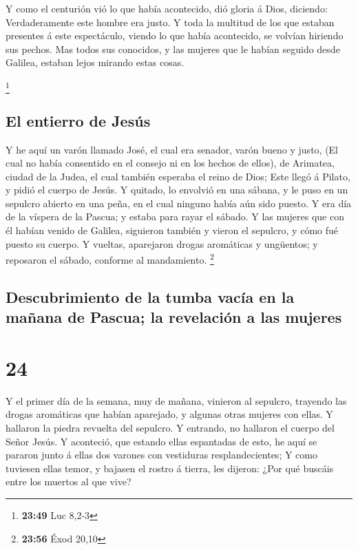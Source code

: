  Y como el centurión vió lo que había acontecido, dió
gloria á Dios, diciendo: Verdaderamente este hombre era justo.
 Y toda la multitud de los que estaban presentes á este
espectáculo, viendo lo que había acontecido, se volvían hiriendo sus
pechos.  Mas todos sus conocidos, y las mujeres que le
habían seguido desde Galilea, estaban lejos mirando estas cosas.

\footnote{\textbf{23:49} Luc 8,2-3}

\hypertarget{el-entierro-de-jesuxfas}{%
\subsection{El entierro de Jesús}\label{el-entierro-de-jesuxfas}}

 Y he aquí un varón llamado José, el cual era senador,
varón bueno y justo,  (El cual no había consentido en el
consejo ni en los hechos de ellos), de Arimatea, ciudad de la Judea, el
cual también esperaba el reino de Dios;  Este llegó á
Pilato, y pidió el cuerpo de Jesús.  Y quitado, lo envolvió
en una sábana, y le puso en un sepulcro abierto en una peña, en el cual
ninguno había aún sido puesto.  Y era día de la víspera de
la Pascua; y estaba para rayar el sábado.  Y las mujeres
que con él habían venido de Galilea, siguieron también y vieron el
sepulcro, y cómo fué puesto su cuerpo.  Y vueltas,
aparejaron drogas aromáticas y ungüentos; y reposaron el sábado,
conforme al mandamiento. \footnote{\textbf{23:56} Éxod 20,10}

\hypertarget{descubrimiento-de-la-tumba-vacuxeda-en-la-mauxf1ana-de-pascua-la-revelaciuxf3n-a-las-mujeres}{%
\subsection{Descubrimiento de la tumba vacía en la mañana de Pascua; la
revelación a las
mujeres}\label{descubrimiento-de-la-tumba-vacuxeda-en-la-mauxf1ana-de-pascua-la-revelaciuxf3n-a-las-mujeres}}

\hypertarget{section-23}{%
\section{24}\label{section-23}}

 Y el primer día de la semana, muy de mañana, vinieron al
sepulcro, trayendo las drogas aromáticas que habían aparejado, y algunas
otras mujeres con ellas.  Y hallaron la piedra revuelta del
sepulcro.  Y entrando, no hallaron el cuerpo del Señor
Jesús.  Y aconteció, que estando ellas espantadas de esto,
he aquí se pararon junto á ellas dos varones con vestiduras
resplandecientes;  Y como tuviesen ellas temor, y bajasen el
rostro á tierra, les dijeron: ¿Por qué buscáis entre los muertos al que
vive?

